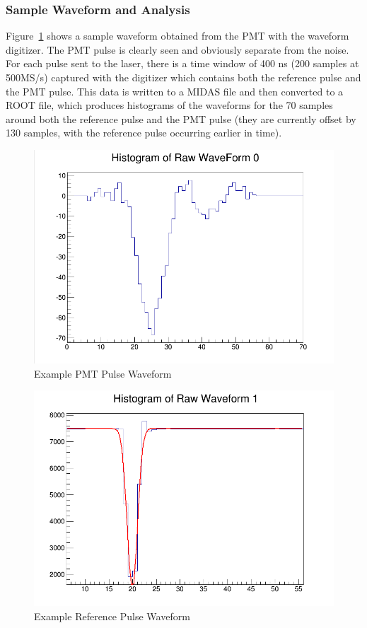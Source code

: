 \documentclass[twoside,letterpaper]{refart}
\newcommand{\picwidth}{0.7 \textwidth}
\begin{document}
\subsubsection{Sample Waveform and Analysis}\label{waveformAnalysis}

Figure~\ref{sampleWav} shows a sample waveform obtained from the PMT with the waveform digitizer. The PMT pulse is clearly seen and obviously separate from the noise. For each pulse sent to the laser, there is a time window of 400 ns (200 samples at 500MS/s) captured with the digitizer which contains both the reference pulse and the PMT pulse. This data is written to a MIDAS file and then converted to a ROOT file, which produces histograms of the waveforms for the 70 samples around both the reference pulse and the PMT pulse (they are currently offset by 130 samples, with the reference pulse occurring earlier in time).

\FloatBarrier

\begin{figure}[!htpb]\centering	
	\includegraphics[width=\picwidth]{images/sampleWav.png}
	\caption{Example PMT Pulse Waveform\label{sampleWav}}
\end{figure}

\FloatBarrier

\begin{figure}[!htpb]\centering	
	\includegraphics[width=\picwidth]{images/refWav.png}
	\caption{Example Reference Pulse Waveform\label{refWav}}
\end{figure}
\end{document}
